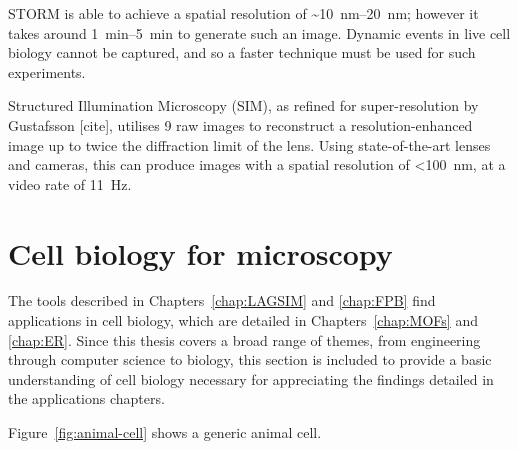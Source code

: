 STORM is able to achieve a spatial resolution of \textasciitilde\SIrange[range-phrase=--]{10}{20}{\nano\metre}; however it takes around \SIrange[range-phrase=--]{1}{5}{\minute} to generate such an image.
Dynamic events in live cell biology cannot be captured, and so a faster technique must be used for such experiments. 

Structured Illumination Microscopy (SIM), as refined for super-resolution by Gustafsson [cite], utilises 9 raw images to reconstruct a resolution-enhanced image up to twice the diffraction limit of the lens.
Using state-of-the-art lenses and cameras, this can produce images with a spatial resolution of <\SI{100}{\nano\metre}, at a video rate of \SI{11}{\hertz}.  


\section{Cell biology for microscopy}
The tools described in Chapters~\ref{chap:LAGSIM} and \ref{chap:FPB} find applications in cell biology, which are detailed in Chapters~\ref{chap:MOFs} and \ref{chap:ER}.
Since this thesis covers a broad range of themes, from engineering through computer science to biology, this section is included to provide a basic understanding of cell biology necessary for appreciating the findings detailed in the applications chapters. 

Figure~\ref{fig:animal-cell} shows a generic animal cell. 

